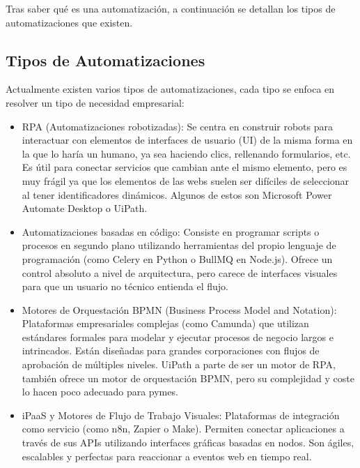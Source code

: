 \documentclass[12pt, a4paper]{book}
\begin{document}
Tras saber qué es una automatización, a continuación se detallan los tipos de automatizaciones que existen.

\subsection{Tipos de Automatizaciones}

Actualmente existen varios tipos de automatizaciones, cada tipo se enfoca en resolver un tipo de necesidad empresarial:

\begin{itemize}

    \item RPA (Automatizaciones robotizadas): Se centra en construir robots para interactuar con elementos de interfaces de usuario (UI) de la misma forma en la que lo haría un humano, ya sea haciendo clics, rellenando formularios, etc. Es útil para conectar servicios que cambian ante el mismo elemento, pero es muy frágil ya que los elementos de las webs suelen ser difíciles de seleccionar al tener identificadores dinámicos. Algunos de estos son Microsoft Power Automate Desktop o UiPath.

    \item Automatizaciones basadas en código: Consiste en programar scripts o procesos en segundo plano utilizando herramientas del propio lenguaje de programación (como Celery en Python o BullMQ en Node.js). Ofrece un control absoluto a nivel de arquitectura, pero carece de interfaces visuales para que un usuario no técnico entienda el flujo.

    \item Motores de Orquestación BPMN (Business Process Model and Notation): Plataformas empresariales complejas (como Camunda) que utilizan estándares formales para modelar y ejecutar procesos de negocio largos e intrincados. Están diseñadas para grandes corporaciones con flujos de aprobación de múltiples niveles. UiPath a parte de ser un motor de RPA, también ofrece un motor de orquestación BPMN, pero su complejidad y coste lo hacen poco adecuado para pymes.

    \item iPaaS y Motores de Flujo de Trabajo Visuales: Plataformas de integración como servicio (como n8n, Zapier o Make). Permiten conectar aplicaciones a través de sus APIs utilizando interfaces gráficas basadas en nodos. Son ágiles, escalables y perfectas para reaccionar a eventos web en tiempo real.

\end{itemize}
\end{document}
